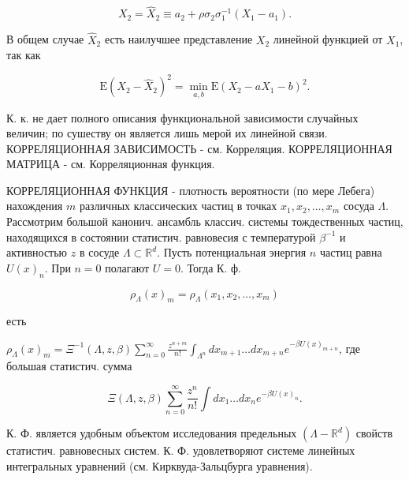 \documentclass[10pt]{article}
\begin{document}
\[

X_{2}=\hat{X}_{2} \equiv a_{2}+\rho \sigma_{2} \sigma_{1}^{-1}\left(X_{1}-a_{1}\right) .

\]



В общем случае $\hat{X}_{2}$ есть наилучшее представление $X_{2}$ линейной функцией от $X_{1}$, так как



\[

\mathrm{E}\left(X_{2}-\hat{X}_{2}\right)^{2}=\min _{a, b} \mathrm{E}\left(X_{2}-a X_{1}-b\right)^{2} .

\]



К. к. не дает полного описания функциональной зависимости случайных величин; по сушеству он является лишь мерой их линейной связи. КОРРЕЛЯЦИОННАЯ ЗАВИСИМОСТЬ - см. Корреляция. КОРРЕЛЯЦИОННАЯ МАТРИЦА - см. Корреляционная функция.



КОРРЕЛЯЦИОННАЯ ФУНКЦИЯ - плотность вероятности (по мере Лебега) нахождения $m$ различных классических частиц в точках $x_{1}, x_{2}, \ldots, x_{m}$ сосуда $\Lambda$. Рассмотрим большой канонич. ансамбль классич. системы тождественных частиц, находящихся в состоянии статистич. равновесия с температурой $\beta^{-1}$ и активностью $z$ в сосуде $\Lambda \subset \mathbb{R}^{d}$. Пусть потенциальная энергия $n$ частиц равна $U(x)_{n}$. При $n=0$ полагают $U=0$. Тогда К. ф.



\[

\rho_{\Lambda}(x)_{m}=\rho_{\Lambda}\left(x_{1}, x_{2}, \ldots, x_{m}\right)

\]



есть



$\rho_{\Lambda}(x)_{m}=\Xi^{-1}(\Lambda, z, \beta) \sum_{n=0}^{\infty} \frac{z^{n+m}}{n !} \int_{\Lambda^{n}} d x_{m+1} \ldots d x_{m+n} e^{-\beta U(x)_{m+n}}$, где большая статистич. сумма



\[

\Xi(\Lambda, z, \beta) \sum_{n=0}^{\infty} \frac{z^{n}}{n !} \int d x_{1} \ldots d x_{n} e^{-\beta U(x)_{n}} .

\]



К. Ф. является удобным объектом исследования предельных $\left(\Lambda-\mathbb{R}^{d}\right)$ свойств статистич. равновесных систем. К. Ф. удовлетворяют системе линейных интегральных уравнений (см. Кирквуда-Зальцбурга уравнения).
\end{document}
